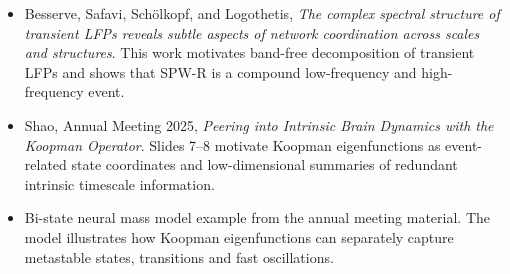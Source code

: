 \documentclass[11pt,a4paper]{ctexart}
\begin{document}
\begin{itemize}[leftmargin=2em]
    \item Besserve, Safavi, Schölkopf, and Logothetis, \emph{The complex spectral structure of transient LFPs reveals subtle aspects of network coordination across scales and structures}. This work motivates band-free decomposition of transient LFPs and shows that SPW-R is a compound low-frequency and high-frequency event.
    \item Shao, Annual Meeting 2025, \emph{Peering into Intrinsic Brain Dynamics with the Koopman Operator}. Slides 7--8 motivate Koopman eigenfunctions as event-related state coordinates and low-dimensional summaries of redundant intrinsic timescale information.
    \item Bi-state neural mass model example from the annual meeting material. The model illustrates how Koopman eigenfunctions can separately capture metastable states, transitions and fast oscillations.
\end{itemize}
\end{document}
